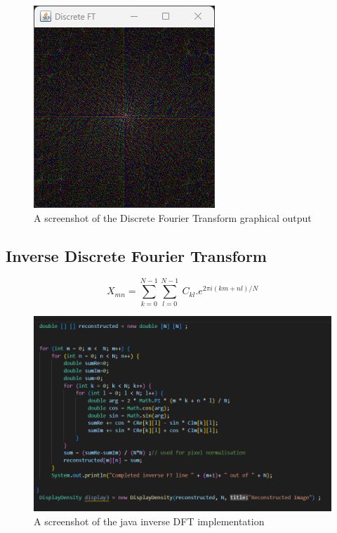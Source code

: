     \begin{figure}[H]
        \centering
        \includegraphics[width=0.8\columnwidth]{Figures/Week 1/W1-FT.png}
        \caption{A screenshot of the Discrete Fourier Transform graphical output}
        \label{fig:wolf-DFT}
    \end{figure}
    
    
    \subsection{Inverse Discrete Fourier Transform}


        \begin{center}
        \begin{equation}
            X_{mn} = \sum_{k=0}^{N-1} \sum_{l=0}^{N-1}\ C_{kl} . e^{2\pi i(km+nl)/N}
            \label{fig:equation-InverseFT}
        \end{equation}  
        \end{center}

        
        \begin{figure}[H]
            \centering
            \includegraphics[width=0.9\columnwidth]{Figures/Week 1/W1-SimpleFT-InverseDFT-Implementation.png}
            \caption{A screenshot of the java inverse DFT implementation}
            \label{fig:inverse-DFT-Code}
    \end{figure}
    
